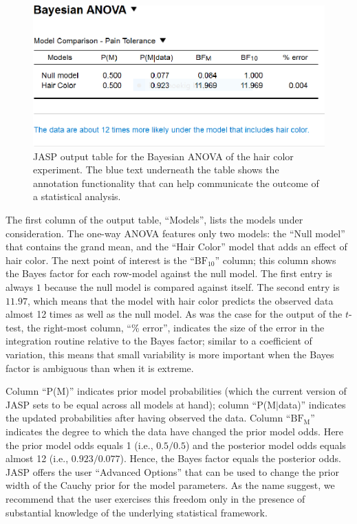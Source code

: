 \begin{figure}[tp]
    \begin{center}
        \includegraphics[width=.9\textwidth]{figs/bi2_HairColorBANOVATable.eps}
        \caption{JASP output table for the Bayesian ANOVA of the hair color experiment. The blue text underneath the table shows the annotation functionality that can help communicate the outcome of a statistical analysis.} \label{fig:bi2:HairColorBANOVATable}
    \end{center}
\end{figure}

The first column of the output table, ``Models'', lists the models under consideration. The one-way ANOVA features only two models: the ``Null model'' that contains the grand mean, and the ``Hair Color'' model that adds an effect of hair color. The next point of interest is the ``$\text{BF}_{10}$'' column; this column shows the Bayes factor for each row-model against the null model. The first entry is always $1$ because the null model is compared against itself. The second entry is $11.97$, which means that the model with hair color predicts the observed data almost 12 times as well as the null model. As was the case for the output of the $t$-test, the right-most column, ``\% error'', indicates the size of the error in the integration routine relative to the Bayes factor; similar to a coefficient of variation, this means that small variability is more important when the Bayes factor is ambiguous than when it is extreme.

Column ``P(M)'' indicates prior model probabilities (which the current version of JASP sets to be equal across all models at hand); column ``P(M$|$data)'' indicates the updated probabilities after having observed the data. Column ``$\text{BF}_\text{M}$'' indicates the degree to which the data have changed the prior model odds. Here the prior model odds equals 1 (i.e., $0.5/0.5$) and the posterior model odds equals almost 12 (i.e., $0.923/0.077$). Hence, the Bayes factor equals the posterior odds. JASP offers the user ``Advanced Options'' that can be used to change the prior width of the Cauchy prior for the model parameters. As the name suggest, we recommend that the user exercises this freedom only in the presence of substantial knowledge of the underlying statistical framework.

